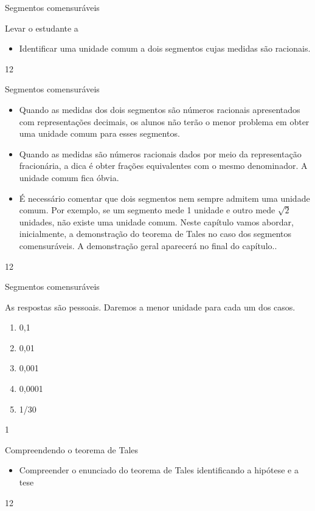 \clearmargin
\begin{objectives}{Segmentos comensuráveis}
{
Levar o estudante a
\begin{itemize}
\item {} 
Identificar uma unidade comum a dois segmentos cujas medidas são racionais.

\end{itemize}
}{1}{2}
\end{objectives}
\begin{sugestions}{Segmentos comensuráveis}
{
\begin{itemize}
\item {} 
Quando as medidas dos dois segmentos são números racionais apresentados com representações decimais, os alunos não terão o menor problema em obter uma unidade comum para esses segmentos.

\item {} 
Quando as medidas são números racionais dados por meio da representação fracionária, a dica é obter frações equivalentes com o mesmo denominador. A unidade comum fica óbvia.

\item {} 
É necessário comentar que dois segmentos nem sempre admitem uma unidade comum. Por exemplo, se um segmento mede 1 unidade e outro mede \(\sqrt{2}\) unidades, não existe uma unidade comum. Neste capítulo vamos abordar, inicialmente, a demonstração do teorema de Tales no caso dos segmentos comensuráveis. A demonstração geral aparecerá no final do capítulo..

\end{itemize}
}{1}{2}
\end{sugestions}
\begin{answer}{Segmentos comensuráveis}
{
As respostas são pessoais. Daremos a menor unidade para cada um dos casos.
\begin{enumerate}
\item {} 
0,1

\item {} 
0,01

\item {} 
0,001

\item {} 
0,0001

\item {} 
1/30

\end{enumerate}
}{1}
\end{answer}
\begin{objectives}{Compreendendo o teorema de Tales}
{
\begin{itemize}
\item {} 
Compreender o enunciado do teorema de Tales identificando   a hipótese e a tese

\end{itemize}
}{1}{2}
\end{objectives}
